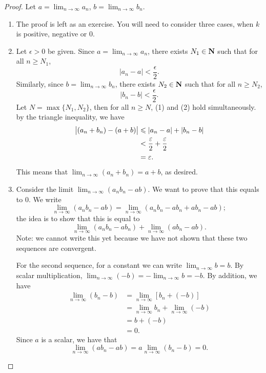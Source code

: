 \begin{proof}
Let $\displaystyle a=\lim_{n\to\infty}a_n$, $\displaystyle b=\lim_{n\to\infty}b_n$.
\begin{enumerate}[label=(\arabic*)]
\item The proof is left as an exercise. You will need to consider three cases, when $k$ is positive, negative or $0$.

\item Let $\epsilon>0$ be given. Since $\displaystyle a=\lim_{n\to\infty}a_n$, there exists $N_1\in\mathbf N$ such that for all $n\ge N_1$,
\begin{equation*}\tag{1}
|a_n-a|<\frac{\epsilon}{2}.
\end{equation*}
Similarly, since $\displaystyle b=\lim_{n\to\infty}b_n$, there exists $N_2\in\mathbf N$ such that for all $n\ge N_2$,
\begin{equation*}\tag{2}
|b_n-b|<\frac{\epsilon}{2}.
\end{equation*} 
Let $N=\max\{N_1,N_2\}$, then for all $n\ge N$, (1) and (2) hold simultaneously. by the triangle inequality, we have
\begin{align*}
\left|(a_n+b_n)-(a+b)\right|
&\leqslant|a_n-a|+|b_n-b|\\
&<\frac{\varepsilon}{2}+\frac{\varepsilon}{2}\\
&=\varepsilon.
\end{align*}
This means that $\displaystyle\lim_{n\to\infty}(a_n+b_n)=a+b$, as desired.

\item Consider the limit $\displaystyle\lim_{n\to\infty}(a_nb_n-ab)$. We want to prove that this equals to $0$. We write
\[\lim_{n\to\infty}(a_nb_n-ab)=\lim_{n\to\infty}(a_nb_n-ab_n+ab_n-ab);\]
the idea is to show that this is equal to
\[\lim_{n\to\infty}(a_nb_n-ab_n)+\lim_{n\to\infty}(ab_n-ab).\]
Note: we cannot write this yet because we have not shown that these two sequences are convergent.

For the second sequence, for a constant we can write $\displaystyle\lim_{n\to\infty}b=b$. By scalar multiplication, $\displaystyle\lim_{n\to\infty}(-b)=-\lim_{n\to\infty}b=-b$. By addition, we have 
\begin{align*}
\lim_{n\to\infty}(b_n-b)
&=\lim_{n\to\infty}[b_n+(-b)]\\
&=\lim_{n\to\infty}b_n+\lim_{n\to\infty}(-b)\\
&=b+(-b)\\
&=0.
\end{align*}
Since $a$ is a scalar, we have that
\[\lim_{n\to\infty}(ab_n-ab)=a\lim_{n\to\infty}(b_n-b)=0.\]


\end{enumerate}
\end{proof}
